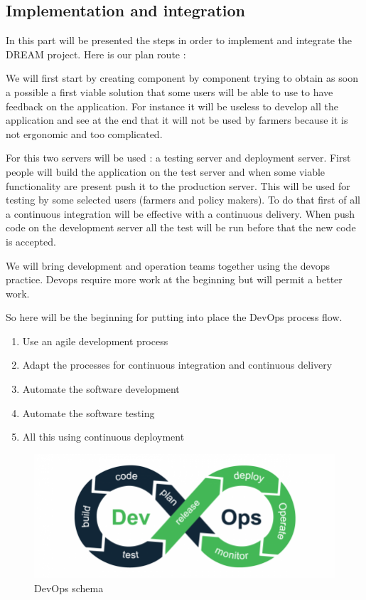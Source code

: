 \subsection{Implementation and integration}
In this part will be presented the steps in order to implement and integrate the DREAM project. Here is our plan route : 

We will first start by creating component by component trying to obtain as soon a possible a first viable solution that some users will be able to use to have feedback on the application. For instance it will be useless to develop all the application and see at the end that it will not be used by farmers because it is not ergonomic and too complicated.

For this two servers will be used : a testing server and deployment server. First people will build the application on the test server and when some viable functionality are present push it to the production server. This will be used for testing by some selected users (farmers and policy makers). To do that first of all a continuous integration will be effective with a continuous delivery. When push code on the development server all the test will be run before that the new code is accepted.

We will bring development and operation teams together using the devops practice. Devops require more work at the beginning but will permit a better work.

So here will be the beginning for putting into place the DevOps process flow.
\begin{enumerate}
	\item Use an agile development process
	\item Adapt the processes for continuous integration and continuous delivery
	\item Automate the software development
	\item Automate the software testing
	\item All this using continuous deployment
\end{enumerate}

\begin{figure}[H]
	\centering
	\includegraphics[width=0.8\columnwidth]{Images/schema-devops.png}
	\caption{DevOps schema}
	\label{Fig:devopsschema}
\end{figure}

